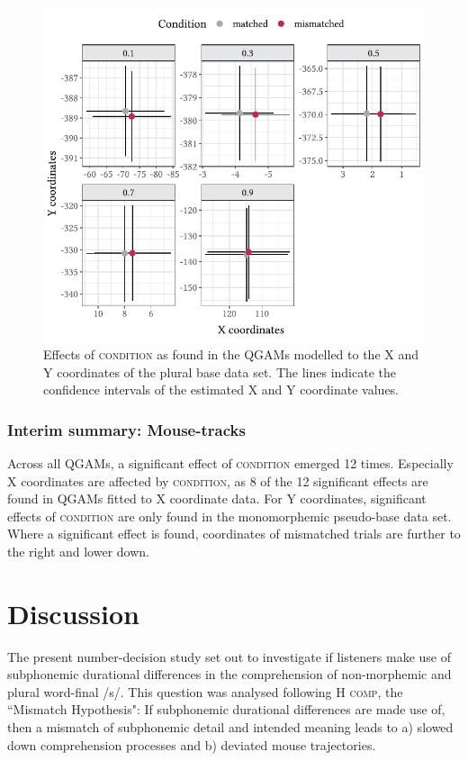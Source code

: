 \begin{figure}
    \centering
    \includegraphics[]{figures/fig7.11.pdf}
    \caption{Effects of \textsc{condition} as found in the QGAMs modelled to the X and Y coordinates of the plural base data set. The lines indicate the confidence intervals of the estimated X and Y coordinate values.}
    \label{fig:7_11}
\end{figure}

\subsubsection{Interim summary: Mouse-tracks}\label{section07_2_3_3}

Across all QGAMs, a significant effect of \textsc{condition} emerged 12 times. Especially X coordinates are affected by \textsc{condition}, as 8 of the 12 significant effects are found in QGAMs fitted to X coordinate data. For Y coordinates, significant effects of \textsc{condition} are only found in the monomorphemic pseudo-base data set. Where a significant effect is found, coordinates of mismatched trials are further to the right and lower down.

\section{Discussion}\label{section07_3}

The present number-decision study set out to investigate if listeners make use of subphonemic durational differences in the comprehension of non-morphemic and plural word-final /s/. This question was analysed following \textsc{H comp}, the ``Mismatch Hypothesis": If subphonemic durational differences are made use of, then a mismatch of subphonemic detail and intended meaning leads to a) slowed down comprehension processes and b) deviated mouse trajectories.


